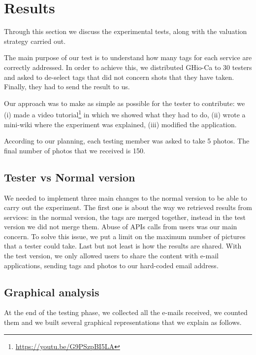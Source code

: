 \section{Results}
\label{sec:results}

Through this section we discuss the experimental tests, along with the valuation strategy carried out. 

The main purpose of our test is to understand how many tags for each service 
are correctly addressed. In order to achieve this, we distributed GHio-Ca to 
30 testers and asked to de-select tags that did not concern shots that they 
have taken. Finally, they had to send the result to us.

Our approach was to make as simple as possible for the tester to contribute: 
we (i) made a video tutorial\footnote{\url{https://youtu.be/G9PSzpBI5LA}} in 
which we showed what they had to do, (ii) wrote a mini-wiki where the 
experiment was explained, (iii) modified the application. 

According to our planning, each testing member was asked to take 5 photos. 
The final number of photos that we received is 150.

\subsection{Tester vs Normal version}

We needed to implement three main changes to the normal version to be able to 
carry out the experiment. The first one is about the way we retrieved results 
from services: in the normal version, the tags are merged together, instead in 
the test version we did not merge them.
Abuse of APIs calls from users was our main concern. To solve this issue, we 
put a limit on the maximum number of pictures that a tester could take.
Last but not least is how the results are shared. With the test version, we 
only allowed users to share the content with e-mail applications, sending tags 
and photos to our hard-coded email address.

\subsection{Graphical analysis}

At the end of the testing phase, we collected all the e-mails received, we 
counted them and we built several graphical representations that we 
explain as follows.

